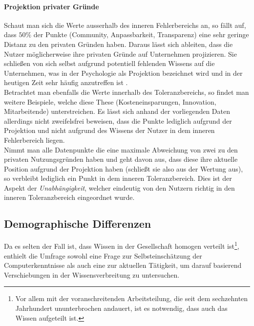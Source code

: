 \documentclass[a4paper]{article}
\begin{document}
                \paragraph{Projektion privater Gründe}
                    Schaut man sich die Werte ausserhalb des inneren Fehlerbereichs an, so fällt auf, dass $50 \%$ der Punkte ({\scriptsize Community, Anpassbarkeit, Transparenz}) eine sehr geringe Distanz zu den privaten Gründen haben. Daraus lässt sich ableiten, dass die Nutzer möglicherweise ihre privaten Gründe auf Unternehmen projizieren. Sie schließen von sich selbst aufgrund potentiell fehlenden Wissens auf die Unternehmen, was in der Psychologie als Projektion bezeichnet wird und in der heutigen Zeit sehr häufig anzutreffen ist \cite{psychology:freud-defense-projection}.\\
                    Betrachtet man ebenfalls die Werte innerhalb des Toleranzbereichs, so findet man weitere Beispiele, welche diese These ({\scriptsize Kosteneinsparungen, Innovation, Mitarbeitende}) unterstreichen. Es lässt sich anhand der vorliegenden Daten allerdings nicht zweifelsfrei beweisen, dass die Punkte lediglich aufgrund der Projektion und nicht aufgrund des Wissens der Nutzer in dem inneren Fehlerbereich liegen.\\
                    Nimmt man alle Datenpunkte die eine maximale Abweichung von zwei zu den privaten Nutzungsgründen haben und geht davon aus, dass diese ihre aktuelle Position aufgrund der Projektion haben (schließt sie also aus der Wertung aus), so verbleibt lediglich ein Punkt in dem inneren Toleranzbereich. Dies ist der Aspekt der \emph{Unabhängigkeit}, welcher eindeutig von den Nutzern richtig in den inneren Toleranzbereich eingeordnet wurde.
    
        \subsection{Demographische Differenzen}
            Da es selten der Fall ist, dass Wissen in der Gesellschaft homogen verteilt ist\footnote{Vor allem mit der voranschreitenden Arbeitsteilung, die seit dem sechzehnten Jahrhundert ununterbrochen andauert, ist es notwendig, dass auch das Wissen aufgeteilt ist\cite{mckeon:divison_of_knowledge}.}, enthielt die Umfrage sowohl eine Frage zur Selbsteinschätzung der Computerkenntnisse als auch eine zur aktuellen Tätigkeit, um darauf basierend Verschiebungen in der Wissensverbreitung zu untersuchen.
            
\end{document}
